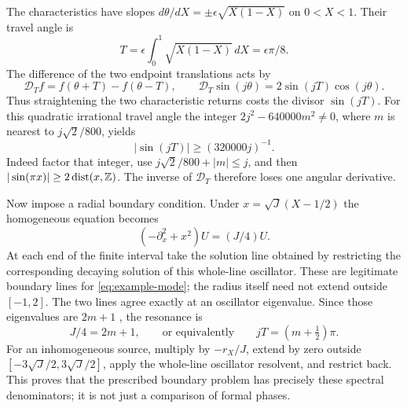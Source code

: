 The characteristics have slopes
$d\theta/dX=\pm\epsilon\sqrt{X(1-X)}$ on $0<X<1$.
Their travel angle is
\begin{equation}\label{eq:example-action}
 T=\epsilon\int_0^1\sqrt{X(1-X)}\,dX=\epsilon\pi/8.
\end{equation}
The difference of the two endpoint translations acts by
\begin{equation}\label{eq:example-circle-operator}
 \mathcal D_T f=f(\theta+T)-f(\theta-T),\qquad
 \mathcal D_T\sin(j\theta)=2\sin(jT)\cos(j\theta).
\end{equation}
Thus straightening the two characteristic returns costs the divisor
$\sin(jT)$. For this quadratic irrational travel angle the integer
$2j^2-640000m^2\ne0$, where $m$ is nearest to $j\sqrt2/800$, yields
\begin{equation}\label{eq:example-diophantine-bound}
 |\sin(jT)|\ge (320000j)^{-1}.
\end{equation}
Indeed factor that integer, use
$j\sqrt2/800+|m|\le j$, and then
$|\sin(\pi x)|\ge2\operatorname{dist}(x,\mathbb Z)$.
The inverse of $\mathcal D_T$ therefore loses one angular derivative.

Now impose a radial boundary condition. Under
$x=\sqrt J(X-1/2)$ the homogeneous equation becomes
\begin{equation}\label{eq:example-oscillator}
 (-\partial_x^2+x^2)U=(J/4)U.
\end{equation}
At each end of the finite interval take the solution line obtained
by restricting the corresponding decaying solution of this
whole-line oscillator. These are legitimate boundary lines for
\eqref{eq:example-mode}; the radius itself need not extend outside
$[-1,2]$. The two lines agree exactly at an oscillator eigenvalue.
Since those eigenvalues are $2m+1$
\cite[Section~8.3]{Teschl2009}, the resonance is
\begin{equation}\label{eq:example-spectral-phase}
 J/4=2m+1,
 \qquad\text{or equivalently}\qquad
 jT=(m+\tfrac12)\pi.
\end{equation}
For an inhomogeneous source, multiply by $-r_X/J$, extend by zero
outside $[-3\sqrt J/2,3\sqrt J/2]$, apply the whole-line oscillator
resolvent, and restrict back. This proves that the prescribed boundary
problem has precisely these spectral denominators; it is not just
a comparison of formal phases.

